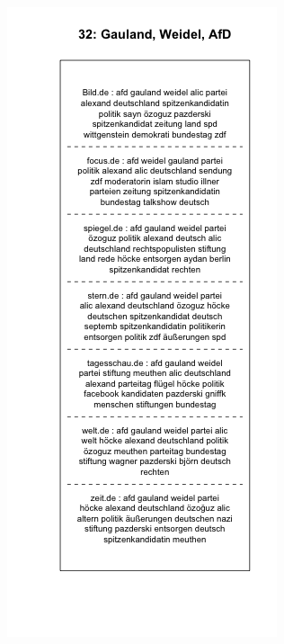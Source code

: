 \documentclass[12pt,a4paper,notitlepage]{article}
\begin{document}
{\begin{figure}[H]
\begin{center}
\begin{subfigure}[normla]{0.49\textwidth}
		\end{subfigure}
		\begin{subfigure}[normla]{0.49\textwidth}
			\includegraphics[width=\textwidth]{../figs/plotquote32.png}
		\end{subfigure}
	\end{center}
\end{figure}

}
\end{document}
